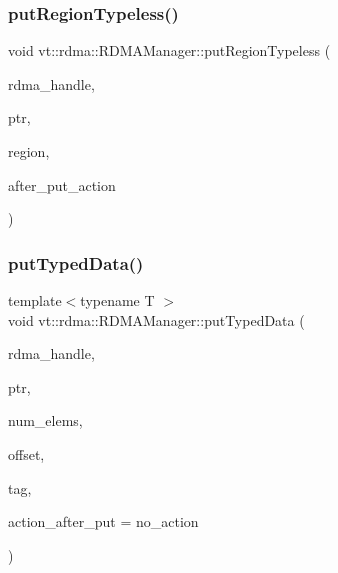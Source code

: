 \subsubsection{\texorpdfstring{put\+Region\+Typeless()}{putRegionTypeless()}}
{\footnotesize\ttfamily void vt\+::rdma\+::\+R\+D\+M\+A\+Manager\+::put\+Region\+Typeless (\begin{DoxyParamCaption}\item[{\hyperlink{namespacevt_a10442579ec4e7ebef223818e64bcf908}{R\+D\+M\+A\+\_\+\+Handle\+Type} const \&}]{rdma\+\_\+handle,  }\item[{\hyperlink{namespacevt_a9e2c953286c7616f7c218e9951790776}{R\+D\+M\+A\+\_\+\+Ptr\+Type} const \&}]{ptr,  }\item[{\hyperlink{structvt_1_1rdma_1_1_r_d_m_a_manager_aafc574f533ebf5b34c1389ef504448bf}{R\+D\+M\+A\+\_\+\+Region\+Type} const \&}]{region,  }\item[{\hyperlink{namespacevt_ae0a5a7b18cc99d7b732cb4d44f46b0f3}{Action\+Type}}]{after\+\_\+put\+\_\+action }\end{DoxyParamCaption})}

\mbox{\label{structvt_1_1rdma_1_1_r_d_m_a_manager_a30167dbd8b0165a273a9d91c84acded1}} 
\subsubsection{\texorpdfstring{put\+Typed\+Data()}{putTypedData()}\hspace{0.1cm}{\footnotesize\ttfamily [1/2]}}
{\footnotesize\ttfamily template$<$typename T $>$ \\
void vt\+::rdma\+::\+R\+D\+M\+A\+Manager\+::put\+Typed\+Data (\begin{DoxyParamCaption}\item[{\hyperlink{namespacevt_a10442579ec4e7ebef223818e64bcf908}{R\+D\+M\+A\+\_\+\+Handle\+Type} const \&}]{rdma\+\_\+handle,  }\item[{T}]{ptr,  }\item[{\hyperlink{namespacevt_aab8d55968084610ce3b17057981e9300}{Byte\+Type} const \&}]{num\+\_\+elems,  }\item[{\hyperlink{namespacevt_aab8d55968084610ce3b17057981e9300}{Byte\+Type} const \&}]{offset,  }\item[{\hyperlink{namespacevt_a84ab281dae04a52a4b243d6bf62d0e52}{Tag\+Type} const \&}]{tag,  }\item[{\hyperlink{namespacevt_ae0a5a7b18cc99d7b732cb4d44f46b0f3}{Action\+Type}}]{action\+\_\+after\+\_\+put = {\ttfamily no\+\_\+action} }\end{DoxyParamCaption})\hspace{0.3cm}{\ttfamily [inline]}}

